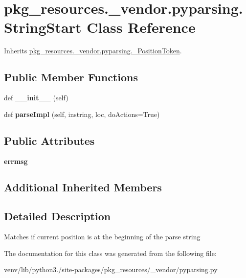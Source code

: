 \hypertarget{classpkg__resources_1_1__vendor_1_1pyparsing_1_1_string_start}{}\section{pkg\+\_\+resources.\+\_\+vendor.\+pyparsing.\+String\+Start Class Reference}
\label{classpkg__resources_1_1__vendor_1_1pyparsing_1_1_string_start}


Inherits \hyperlink{classpkg__resources_1_1__vendor_1_1pyparsing_1_1___position_token}{pkg\+\_\+resources.\+\_\+vendor.\+pyparsing.\+\_\+\+Position\+Token}.

\subsection*{Public Member Functions}
\begin{DoxyCompactItemize}
\item 
\mbox{\label{classpkg__resources_1_1__vendor_1_1pyparsing_1_1_string_start_a6f69bb4095ac5353e95703c37031f800}} 
def {\bfseries \+\_\+\+\_\+init\+\_\+\+\_\+} (self)
\item 
\mbox{\label{classpkg__resources_1_1__vendor_1_1pyparsing_1_1_string_start_ae628fd3323c7c51d5ebba967bb717c84}} 
def {\bfseries parse\+Impl} (self, instring, loc, do\+Actions=True)
\end{DoxyCompactItemize}
\subsection*{Public Attributes}
\begin{DoxyCompactItemize}
\item 
\mbox{\label{classpkg__resources_1_1__vendor_1_1pyparsing_1_1_string_start_af0230225970611c98a0d6c8dd177bdde}} 
{\bfseries errmsg}
\end{DoxyCompactItemize}
\subsection*{Additional Inherited Members}


\subsection{Detailed Description}
\begin{DoxyVerb}Matches if current position is at the beginning of the parse string
\end{DoxyVerb}
 

The documentation for this class was generated from the following file\+:\begin{DoxyCompactItemize}
\item 
venv/lib/python3./site-\/packages/pkg\+\_\+resources/\+\_\+vendor/pyparsing.\+py\end{DoxyCompactItemize}
